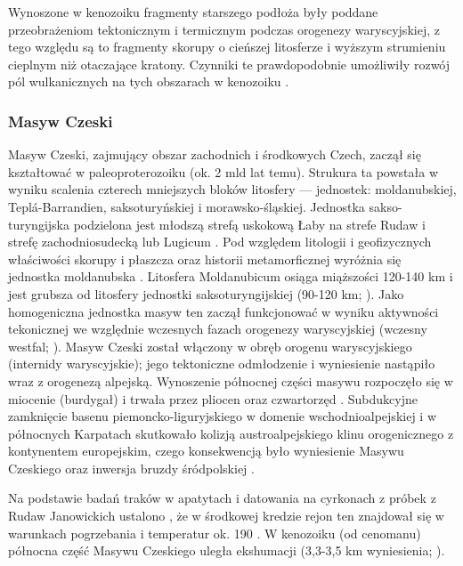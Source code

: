 \documentclass[11.5pt,twoside]{report}
\begin{document}
Wynoszone w kenozoiku fragmenty starszego podłoża były poddane przeobrażeniom tektonicznym i termicznym podczas orogenezy waryscyjskiej, z tego względu są to fragmenty skorupy o cieńszej litosferze i wyższym strumieniu cieplnym niż otaczające kratony. Czynniki te prawdopodobnie umożliwiły rozwój pól wulkanicznych na tych obszarach w kenozoiku \parencite{Wilson.2006}.



		\subsubsection{Masyw Czeski}

Masyw Czeski, zajmujący obszar zachodnich i środkowych Czech, zaczął się kształtować w paleoproterozoiku (ok. 2 mld lat temu). Strukura ta powstała w wyniku scalenia czterech mniejszych bloków litosfery --- jednostek: moldanubskiej, Tepl\'{a}-Barrandien, saksoturyńskiej i morawsko-śląskiej. Jednostka sakso-turyngijska podzielona jest młodszą strefą uskokową Łaby na strefe Rudaw i strefę zachodniosudecką lub Lugicum \parencite{Grygar.2016}. Pod względem litologii i geofizycznych właściwości skorupy i płaszcza oraz historii metamorficznej wyróżnia się jednostka moldanubska \parencite{Grygar.2016}. Litosfera Moldanubicum osiąga miąższości 120-140 km i jest grubsza od litosfery jednostki saksoturyngijskiej (90-120 km; \cite{Babuska.2001}). Jako homogeniczna jednostka masyw ten zaczął funkcjonować w wyniku aktywności tekonicznej we względnie wczesnych fazach orogenezy waryscyjskiej (wczesny westfal; \cite{Grygar.2016}). Masyw Czeski został włączony w obręb orogenu waryscyjskiego (internidy waryscyjskie); jego tektoniczne odmłodzenie i wyniesienie nastąpiło wraz z orogenezą alpejską. Wynoszenie północnej części masywu rozpoczęło się w miocenie (burdygał) i trwała przez pliocen oraz czwartorzęd \parencite{Dezes.2004}. Subdukcyjne zamknięcie basenu piemoncko-liguryjskiego w domenie wschodnioalpejskiej i w północnych Karpatach skutkowało kolizją austroalpejskiego klinu orogenicznego z kontynentem europejskim, czego konsekwencją było wyniesienie Masywu Czeskiego oraz inwersja bruzdy śródpolskiej \parencite{Dezes.2004}.

Na podstawie badań traków w apatytach i datowania na cyrkonach z próbek z Rudaw Janowickich ustalono \parencite{Sobczyk.2015}, że w środkowej kredzie rejon ten znajdował się w warunkach pogrzebania i temperatur ok. 190 \textcelsius. W kenozoiku (od cenomanu) północna część Masywu Czeskiego uległa ekshumacji (3,3-3,5 km wyniesienia; \cite{Sobczyk.2015}). 
\end{document}
